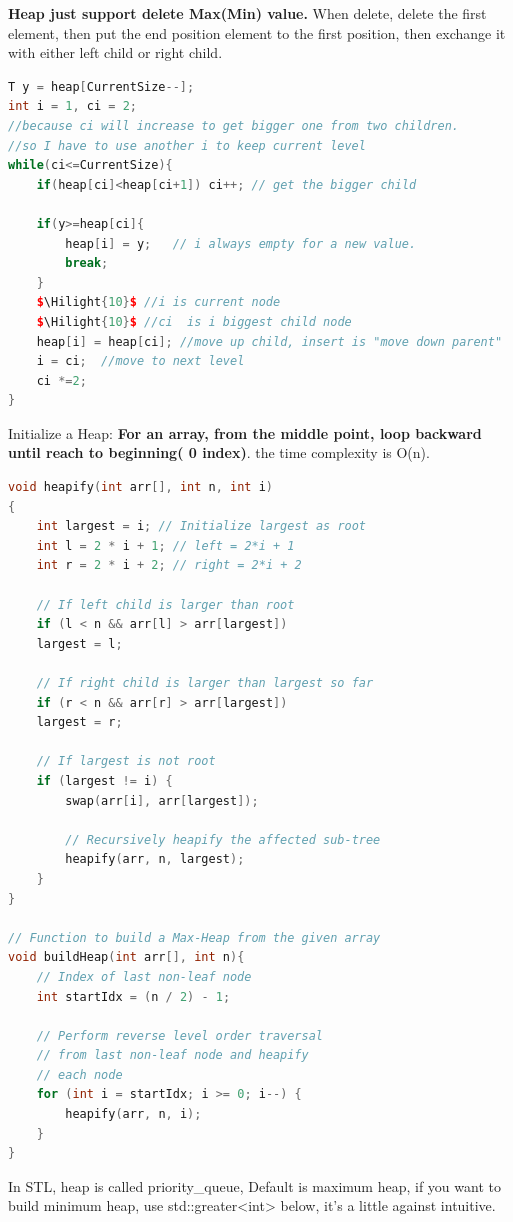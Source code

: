 \documentclass[a4paper,11pt,twoside]{book}
\newcommand{\Hilight}[1]{\makebox[0pt][l]{\color{yellow}\rule[-3pt]{#1em}{11pt}}}
\begin{document}
\par \textbf{Heap just support delete Max(Min) value.} When delete, delete the first element, then put the end position element to the first position, then exchange it with either left child or right child. 
\begin{lstlisting}[frame=single, language=c++, mathescape=true]
T y = heap[CurrentSize--];
int i = 1, ci = 2;
//because ci will increase to get bigger one from two children.
//so I have to use another i to keep current level
while(ci<=CurrentSize){
	if(heap[ci]<heap[ci+1]) ci++; // get the bigger child
	
	if(y>=heap[ci]{
		heap[i] = y;   // i always empty for a new value. 
		break; 
	}
	$\Hilight{10}$ //i is current node
	$\Hilight{10}$ //ci  is i biggest child node
	heap[i] = heap[ci]; //move up child, insert is "move down parent"
	i = ci;  //move to next level
	ci *=2;
}	
\end{lstlisting}



\par Initialize a Heap: \textbf{For an array, from the middle point, loop backward until reach to beginning( 0 index)}. the time complexity is O(n). 

\begin{lstlisting}[frame=single, language=c++]
void heapify(int arr[], int n, int i)
{
	int largest = i; // Initialize largest as root
	int l = 2 * i + 1; // left = 2*i + 1
	int r = 2 * i + 2; // right = 2*i + 2
	
	// If left child is larger than root
	if (l < n && arr[l] > arr[largest])
	largest = l;
	
	// If right child is larger than largest so far
	if (r < n && arr[r] > arr[largest])
	largest = r;
	
	// If largest is not root
	if (largest != i) {
		swap(arr[i], arr[largest]);
		
		// Recursively heapify the affected sub-tree
		heapify(arr, n, largest);
	}
}

// Function to build a Max-Heap from the given array
void buildHeap(int arr[], int n){
	// Index of last non-leaf node
	int startIdx = (n / 2) - 1;
	
	// Perform reverse level order traversal
	// from last non-leaf node and heapify
	// each node
	for (int i = startIdx; i >= 0; i--) {
		heapify(arr, n, i);
	}
}
\end{lstlisting}



\par In STL, heap is called priority\_queue, Default is maximum heap, if you want to build minimum heap, use std::greater<int> below, it's a little against intuitive. 
\end{document}

